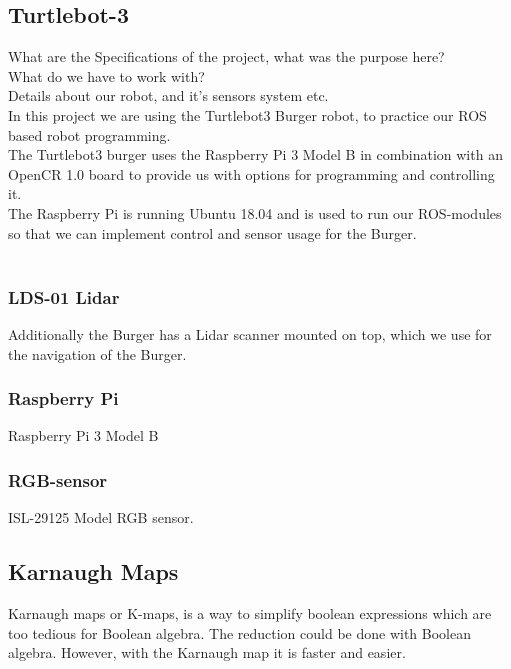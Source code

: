 \documentclass{article}
\begin{document}
\subsection*{Turtlebot-3}
What are the Specifications of the project, what was the purpose here?\\
What do we have to work with?\\
Details about our robot, and it's sensors system etc.\\

In this project we are using the Turtlebot3 Burger robot, to practice our ROS based robot programming.\\
The Turtlebot3 burger uses the Raspberry Pi 3 Model B in combination with an OpenCR 1.0 board to 
provide us with options for programming and controlling it. \\
The Raspberry Pi is running Ubuntu 18.04 and is used to run our ROS-modules so that we can 
implement control and sensor usage for the Burger.\\
\\
\subsubsection*{LDS-01 Lidar}
Additionally the Burger has a Lidar scanner mounted on top, which we use for the navigation of the Burger.\\

\subsubsection*{Raspberry Pi}
Raspberry Pi 3 Model B\\

\subsubsection*{RGB-sensor}
ISL-29125 Model RGB sensor.\\

\subsection*{Karnaugh Maps}
Karnaugh maps or K-maps, is a way to simplify boolean expressions which are too tedious for Boolean algebra. The reduction could be
done with Boolean algebra. However, with the Karnaugh map it is faster and easier.
\end{document}
